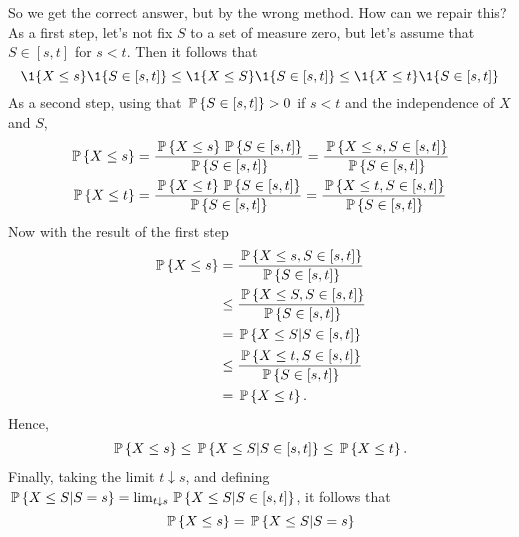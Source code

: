 \begin{question}
\begin{solution}
So we get the correct answer, but by the wrong method.  How can we
repair this?  As a first step, let's not fix $S$ to a set of measure
zero, but let's assume that $S\in [s,t]$ for $s<t$. Then it follows
that
\begin{equation*}
  \1{X\leq s} \1{S\in[s,t]} \leq  \1{X\leq S} \1{S\in[s,t]} \leq \1{X\leq t} \1{S\in[s,t]}
\end{equation*}
As a second step,  using that $\P{S\in[s,t]} > 0$ if $s<t$ and the independence of $X$ and $S$,
\begin{equation*}
  \begin{split}
    \P{X\leq s} &= \frac{\P{X\leq s} \P{S\in[s,t]}}{\P{S\in[s,t]}} = \frac{\P{X\leq s,  S\in[s,t]}}{\P{S\in[s,t]}} \\
    \P{X\leq t} &= \frac{\P{X\leq t} \P{S\in[s,t]}}{\P{S\in[s,t]}} = \frac{\P{X\leq t,  S\in[s,t]}}{\P{S\in[s,t]}}
  \end{split}
\end{equation*}
Now with the result of the first step
\begin{equation*}
  \begin{split}
    \P{X\leq s} 
&= \frac{\P{X\leq s,  S\in[s,t]}}{\P{S\in[s,t]}} \\
&\leq \frac{\P{X\leq S,  S\in[s,t]}}{\P{S\in[s,t]}} \\
&= \P{X\leq S| S\in[s,t]} \\
&\leq \frac{\P{X\leq t,  S\in[s,t]}}{\P{S\in[s,t]}} \\
&= \P{X\leq t}.
  \end{split}
\end{equation*}
Hence, 
\begin{equation*}
  \begin{split}
    \P{X\leq s} \leq \P{X\leq S| S\in[s,t]} \leq \P{X\leq t}.
  \end{split}
\end{equation*}
Finally, taking the limit $t\downarrow s$, and defining $\P{X\leq S|
S = s} = \lim_{t\downarrow s} \P{X\leq S| S\in[s,t]}$, it follows
that
\begin{equation*}
    \P{X\leq s} = \P{X\leq S| S = s}
\end{equation*}


\end{solution}
\end{question}
